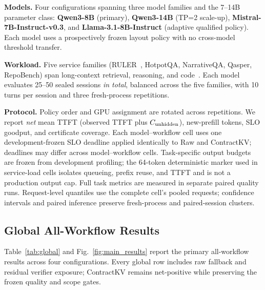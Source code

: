 \documentclass[journal]{IEEEtran}
\begin{document}
\noindent\textbf{Models.}
Four configurations spanning three model families and the 7--14B parameter class: \textbf{Qwen3-8B} (primary), \textbf{Qwen3-14B} (TP=2 scale-up), \textbf{Mistral-7B-Instruct-v0.3}, and \textbf{Llama-3.1-8B-Instruct} (adaptive qualified policy). Each model uses a prospectively frozen layout policy with no cross-model threshold transfer.

\noindent\textbf{Workload.}
Five service families (RULER~\cite{ruler2024}, HotpotQA, NarrativeQA, Qasper, RepoBench) span long-context retrieval, reasoning, and code~\cite{longbench2024}. Each model evaluates 25--50 sealed sessions \emph{in total}, balanced across the five families, with 10 turns per session and three fresh-process repetitions.

\noindent\textbf{Protocol.}
Policy order and GPU assignment are rotated across repetitions. We report \emph{net} mean TTFT (observed TTFT plus $C_{\rm unhidden}$), new-prefill tokens, SLO goodput, and certificate coverage. Each model--workflow cell uses one development-frozen SLO deadline applied identically to Raw and ContractKV; deadlines may differ across model--workflow cells. Task-specific output budgets are frozen from development profiling; the 64-token deterministic marker used in service-load cells isolates queueing, prefix reuse, and TTFT and is not a production output cap. Full task metrics are measured in separate paired quality runs. Request-level quantiles use the complete cell's pooled requests; confidence intervals and paired inference preserve fresh-process and paired-session clusters.

\subsection{Global All-Workflow Results}
\label{sec:main_results}

Table~\ref{tab:global} and Fig.~\ref{fig:main_results} report the primary all-workflow results across four configurations. Every global row includes raw fallback and residual verifier exposure; ContractKV remains net-positive while preserving the frozen quality and scope gates.
\end{document}
